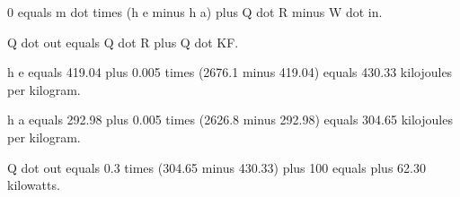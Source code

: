 0 equals m dot times (h e minus h a) plus Q dot R minus W dot in.  

Q dot out equals Q dot R plus Q dot KF.  

h e equals 419.04 plus 0.005 times (2676.1 minus 419.04) equals 430.33 kilojoules per kilogram.  

h a equals 292.98 plus 0.005 times (2626.8 minus 292.98) equals 304.65 kilojoules per kilogram.  

Q dot out equals 0.3 times (304.65 minus 430.33) plus 100 equals plus 62.30 kilowatts.